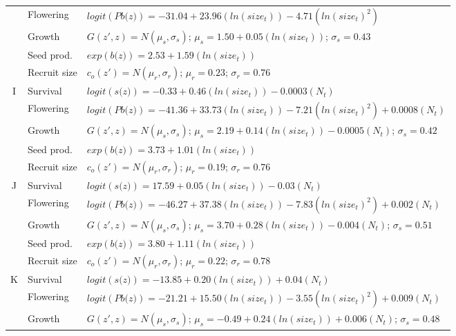 \documentclass[12pt, letterpaper]{article}
\begin{document}
\begin{spacing}{1.3}
\begin{longtable}[ht!]{c|l|p{}}
         \rowcolor[gray]{.95}& Flowering  & $logit(\textit{Pb(z)})  = -31.04 + 23.96(ln(size_t)) -4.71 (ln(size_t)^2)$ \\
         & Growth  &  $G(z',z) = N(\mu_s, \sigma_s)$; $\mu_s = 1.50 + 0.05(ln(size_t))$; $\sigma_s = 0.43$\\
        \rowcolor[gray]{.95} & Seed prod.  & $exp(\textit{b(z)}) = 2.53 + 1.59 (ln(size_t))$  \\
         & Recruit size  &  $c_o(z') = N(\mu_r, \sigma_r)$; $\mu_r = 0.23$; $\sigma_r = 0.76$ \\
         \hline
        \rowcolor[gray]{.95}I &  Survival  &  $logit(\textit{s(z)})= -0.33 +0.46(ln(size_t)) - 0.0003 (N_t)$ \\
         & Flowering  & $logit(\textit{Pb(z)})  = -41.36 + 33.73(ln(size_t)) -7.21 (ln(size_t)^2) + 0.0008(N_t)$ \\
         \rowcolor[gray]{.95}& Growth  &  $G(z',z) = N(\mu_s, \sigma_s)$; $\mu_s = 2.19 + 0.14(ln(size_t)) - 0.0005(N_t)$; $\sigma_s = 0.42$\\
         & Seed prod.  & $exp(\textit{b(z)}) = 3.73 + 1.01(ln(size_t))$  \\
         \rowcolor[gray]{.95}& Recruit size  &  $c_o(z') = N(\mu_r, \sigma_r)$; $\mu_r = 0.19$; $\sigma_r = 0.76$ \\
         \hline
         J &  Survival  &  $logit(\textit{s(z)})= 17.59 +0.05(ln(size_t)) - 0.03 (N_t)$ \\
         \rowcolor[gray]{.95}& Flowering  & $logit(\textit{Pb(z)})  = -46.27 + 37.38(ln(size_t)) -7.83 (ln(size_t)^2) + 0.002(N_t)$ \\
         & Growth  &  $G(z',z) = N(\mu_s, \sigma_s)$; $\mu_s = 3.70 + 0.28(ln(size_t)) - 0.004(N_t)$; $\sigma_s = 0.51$\\
         \rowcolor[gray]{.95}& Seed prod.  & $exp(\textit{b(z)}) = 3.80 + 1.11(ln(size_t))$  \\
         & Recruit size  &  $c_o(z') = N(\mu_r, \sigma_r)$; $\mu_r = 0.22$; $\sigma_r = 0.78$ \\
         \hline
         K\rowcolor[gray]{.95} &  Survival  &  $logit(\textit{s(z)})= -13.85 +0.20(ln(size_t)) + 0.04(N_t)$ \\
         & Flowering  & $logit(\textit{Pb(z)})  = -21.21 + 15.50(ln(size_t)) -3.55(ln(size_t)^2) + 0.009(N_t)$ \\
         \rowcolor[gray]{.95}& Growth  &  $G(z',z) = N(\mu_s, \sigma_s)$; $\mu_s = -0.49 + 0.24(ln(size_t)) + 0.006(N_t)$; $\sigma_s = 0.48$\\

\end{longtable}
\end{spacing}
\end{document}
